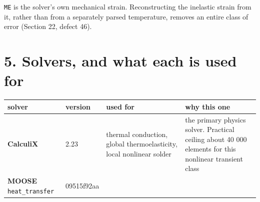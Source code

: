\documentclass[10pt,]{article}
\begin{document}
\texttt{ME} is the solver's own mechanical strain. Reconstructing the
inelastic strain from it, rather than from a separately parsed
temperature, removes an entire class of error (Section 22, defect 46).

\newpage

\hypertarget{solvers-and-what-each-is-used-for}{%
\section{5. Solvers, and what each is used
for}\label{solvers-and-what-each-is-used-for}}

\begin{longtable}[]{@{}llll@{}}
\toprule
\begin{minipage}[b]{0.22\columnwidth}\raggedright
solver\strut
\end{minipage} & \begin{minipage}[b]{0.22\columnwidth}\raggedright
version\strut
\end{minipage} & \begin{minipage}[b]{0.22\columnwidth}\raggedright
used for\strut
\end{minipage} & \begin{minipage}[b]{0.22\columnwidth}\raggedright
why this one\strut
\end{minipage}\tabularnewline
\midrule
\endhead
\begin{minipage}[t]{0.22\columnwidth}\raggedright
\textbf{CalculiX}\strut
\end{minipage} & \begin{minipage}[t]{0.22\columnwidth}\raggedright
2.23\strut
\end{minipage} & \begin{minipage}[t]{0.22\columnwidth}\raggedright
thermal conduction, global thermoelasticity, local nonlinear
solder\strut
\end{minipage} & \begin{minipage}[t]{0.22\columnwidth}\raggedright
the primary physics solver. Practical ceiling about 40 000 elements for
this nonlinear transient class\strut
\end{minipage}\tabularnewline
\begin{minipage}[t]{0.22\columnwidth}\raggedright
\textbf{MOOSE} \texttt{heat\_transfer}\strut
\end{minipage} & \begin{minipage}[t]{0.22\columnwidth}\raggedright
09515f92aa\strut
\end{minipage} & \begin{minipage}[t]{0.22\columnwidth}\raggedright

\end{minipage}
\end{longtable}
\end{document}
